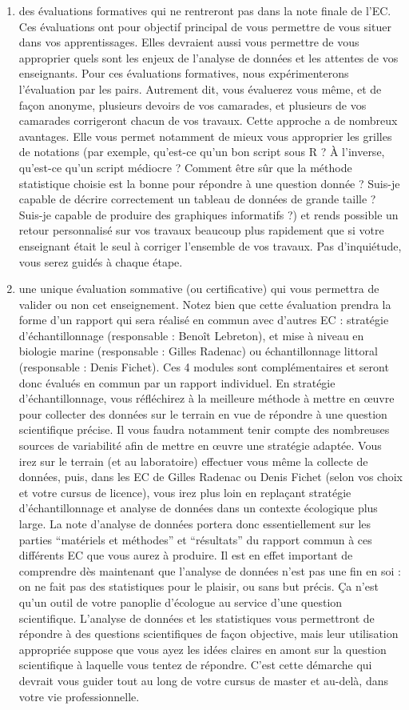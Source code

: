 \documentclass[
  a4paper,
]{article}
\begin{document}
\begin{enumerate}
\def\labelenumi{\arabic{enumi}.}
\item
  des évaluations formatives qui ne rentreront pas dans la note finale de l'EC. Ces évaluations ont pour objectif principal de vous permettre de vous situer dans vos apprentissages. Elles devraient aussi vous permettre de vous approprier quels sont les enjeux de l'analyse de données et les attentes de vos enseignants. Pour ces évaluations formatives, nous expérimenterons l'évaluation par les pairs. Autrement dit, vous évaluerez vous même, et de façon anonyme, plusieurs devoirs de vos camarades, et plusieurs de vos camarades corrigeront chacun de vos travaux. Cette approche a de nombreux avantages. Elle vous permet notamment de mieux vous approprier les grilles de notations (par exemple, qu'est-ce qu'un bon script sous R ? À l'inverse, qu'est-ce qu'un script médiocre ? Comment être sûr que la méthode statistique choisie est la bonne pour répondre à une question donnée ? Suis-je capable de décrire correctement un tableau de données de grande taille ? Suis-je capable de produire des graphiques informatifs ?) et rends possible un retour personnalisé sur vos travaux beaucoup plus rapidement que si votre enseignant était le seul à corriger l'ensemble de vos travaux. Pas d'inquiétude, vous serez guidés à chaque étape.
\item
  une unique évaluation sommative (ou certificative) qui vous permettra de valider ou non cet enseignement. Notez bien que cette évaluation prendra la forme d'un rapport qui sera réalisé en commun avec d'autres EC : stratégie d'échantillonnage (responsable : Benoît Lebreton), et mise à niveau en biologie marine (responsable : Gilles Radenac) ou échantillonnage littoral (responsable : Denis Fichet). Ces 4 modules sont complémentaires et seront donc évalués en commun par un rapport individuel. En stratégie d'échantillonnage, vous réfléchirez à la meilleure méthode à mettre en œuvre pour collecter des données sur le terrain en vue de répondre à une question scientifique précise. Il vous faudra notamment tenir compte des nombreuses sources de variabilité afin de mettre en œuvre une stratégie adaptée. Vous irez sur le terrain (et au laboratoire) effectuer vous même la collecte de données, puis, dans les EC de Gilles Radenac ou Denis Fichet (selon vos choix et votre cursus de licence), vous irez plus loin en replaçant stratégie d'échantillonnage et analyse de données dans un contexte écologique plus large. La note d'analyse de données portera donc essentiellement sur les parties ``matériels et méthodes'' et ``résultats'' du rapport commun à ces différents EC que vous aurez à produire. Il est en effet important de comprendre dès maintenant que l'analyse de données n'est pas une fin en soi : on ne fait pas des statistiques pour le plaisir, ou sans but précis. Ça n'est qu'un outil de votre panoplie d'écologue au service d'une question scientifique. L'analyse de données et les statistiques vous permettront de répondre à des questions scientifiques de façon objective, mais leur utilisation appropriée suppose que vous ayez les idées claires en amont sur la question scientifique à laquelle vous tentez de répondre. C'est cette démarche qui devrait vous guider tout au long de votre cursus de master et au-delà, dans votre vie professionnelle.

\end{enumerate}
\end{document}
